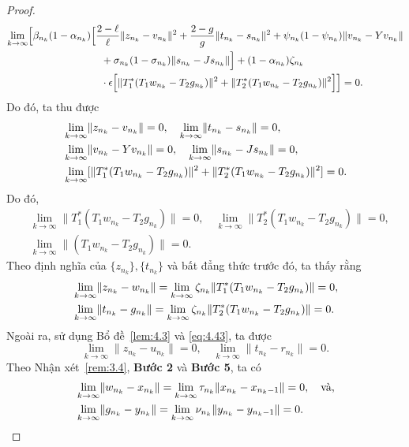 \documentclass[11pt,a4paper]{article}
\theoremstyle{plain}
\theoremstyle{definition}
\theoremstyle{remark}
\numberwithin{equation}{section}
\newcommand{\nm}[1]{\lVert #1\rVert}
\begin{document}
\begin{proof}
\begin{align*}
\lim_{k\to\infty}\Bigl[\beta_{n_k}(1-\alpha_{n_k}) &\Bigl[\frac{2-\ell}{\ell}\nm{z_{n_k}-v_{n_k}}^2+\frac{2-g}{g}\nm{t_{n_k}-s_{n_k}}^2+\psi_{n_k}(1-\psi_{n_k})\nm{v_{n_k}-Yv_{n_k}}\\
&\quad +\sigma_{n_k}(1-\sigma_{n_k})\nm{s_{n_k}-Js_{n_k}}\Bigr]+(1-\alpha_{n_k})\zeta_{n_k}\\
&\quad \cdot\epsilon\Bigl[\nm{T_1^{*}(T_1w_{n_k}-T_2g_{n_k})}^2+\nm{T_2^{*}(T_1w_{n_k}-T_2g_{n_k})}^2\Bigr]\Bigr]=0.
\end{align*}
Do đó, ta thu được
\begin{align}
&\lim_{k\to\infty}\nm{z_{n_k}-v_{n_k}}=0,\quad \lim_{k\to\infty}\nm{t_{n_k}-s_{n_k}}=0,\notag\\
&\lim_{k\to\infty}\nm{v_{n_k}-Yv_{n_k}}=0,\quad \lim_{k\to\infty}\nm{s_{n_k}-Js_{n_k}}=0,\notag\\
&\lim_{k\to\infty}[\nm{T_1^{*}(T_1w_{n_k}-T_2g_{n_k})}^2+\nm{T_2^{*}(T_1w_{n_k}-T_2g_{n_k})}^2]=0. \label{eq:4.43}
\end{align}
Do đó,
\begin{align*}
&\lim_{k\to\infty}\nm{T_1^{*}(T_1w_{n_k}-T_2g_{n_k})}=0,\quad \lim_{k\to\infty}\nm{T_2^{*}(T_1w_{n_k}-T_2g_{n_k})}=0,\\
&\lim_{k\to\infty}\nm{(T_1w_{n_k}-T_2g_{n_k})}=0.
\end{align*}
Theo định nghĩa của $\{z_{n_k}\},\{t_{n_k}\}$ và bất đẳng thức trước đó, ta thấy rằng
\begin{align}
&\lim_{k\to\infty}\nm{z_{n_k}-w_{n_k}}=\lim_{k\to\infty}\zeta_{n_k}\nm{T_1^{*}(T_1w_{n_k}-T_2g_{n_k})}=0,\notag\\
&\lim_{k\to\infty}\nm{t_{n_k}-g_{n_k}}=\lim_{k\to\infty}\zeta_{n_k}\nm{T_2^{*}(T_1w_{n_k}-T_2g_{n_k})}=0. \label{eq:4.44}
\end{align}
Ngoài ra, sử dụng Bổ đề~\ref{lem:4.3} và \eqref{eq:4.43}, ta được
\begin{equation}
\lim_{k\to\infty}\nm{z_{n_k}-u_{n_k}}=0,\quad \lim_{k\to\infty}\nm{t_{n_k}-r_{n_k}}=0. \label{eq:4.45}
\end{equation}
Theo Nhận xét~\ref{rem:3.4}, \textbf{Bước 2} và \textbf{Bước 5}, ta có
\begin{align}
&\lim_{k\to\infty}\nm{w_{n_k}-x_{n_k}}=\lim_{k\to\infty}\tau_{n_k}\nm{x_{n_k}-x_{n_k-1}}=0,\quad\text{và,}\notag\\
&\lim_{k\to\infty}\nm{g_{n_k}-y_{n_k}}=\lim_{k\to\infty}\nu_{n_k}\nm{y_{n_k}-y_{n_k-1}}=0. \label{eq:4.46}
\end{align}

\end{proof}
\end{document}
